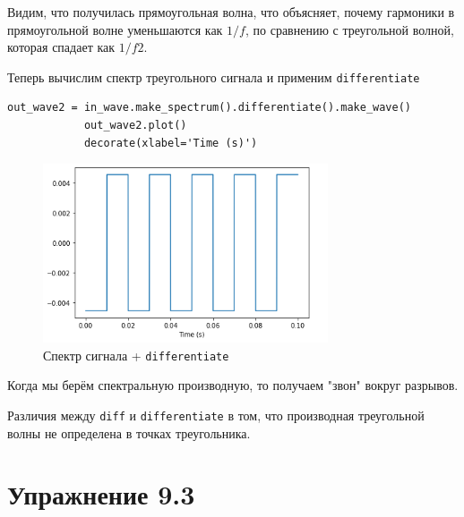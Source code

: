 \documentclass[a4paper,12pt]{article}
\begin{document}
\begin{enumerate}
		Видим, что получилась прямоугольная волна, что объясняет, почему гармоники в прямоугольной волне уменьшаются как $1/f$, по сравнению с треугольной волной, которая спадает как $1/f2$.
		
		
		Теперь вычислим спектр треугольного сигнала и применим \texttt{differentiate}
		\begin{lstlisting}[caption=Спектр сигнала + \texttt{differentiate}]
			out_wave2 = in_wave.make_spectrum().differentiate().make_wave()
			out_wave2.plot()
			decorate(xlabel='Time (s)')
		\end{lstlisting}
		\begin{figure}[H]
			\centering
			\includegraphics[width=0.75\textwidth]{2_2.png}
			\caption{Спектр сигнала + \texttt{differentiate}}
			\label{fig:2.2}
		\end{figure}
		
		Когда мы берём спектральную производную, то получаем "звон" вокруг разрывов.
		
		Различия между \texttt{diff} и \texttt{differentiate} в том, что производная треугольной волны не определена в точках треугольника.
		
	\end{enumerate}
	\newpage
	
	\section{Упражнение 9.3}
	
\end{document}
